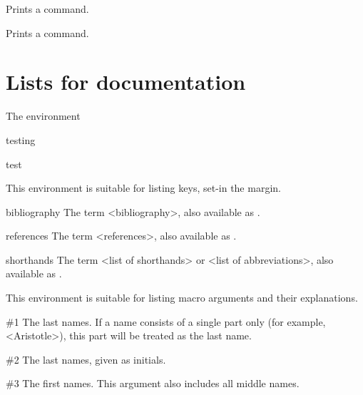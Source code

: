 \begin{marglist}
\item [\cs{cs}]  Prints a command.
\item [\cs{cmd}] \cmd{\cmd}\marg{\cmd{\foo}} Prints a command.
\end{marglist}




\section{Lists for documentation}



The environment 
\begin{marglist}
\item[testing]\lorem
\item [test]\lorem
\end{marglist}

This environment is suitable for listing keys, set-in the margin.

\begin{keymarglist}
\item[bibliography] The term <bibliography>, also available as .
\item[references] The term <references>, also available as .
\item[shorthands] The term <list of shorthands> or <list of abbreviations>, also available as .
\end{keymarglist}


 This environment is suitable for listing macro arguments and their explanations.

\newenvironment*{argumentlist}[1]
  {\list{}{%
     \settowidth{\labelwidth}{\displayverbfont#1}%
     \setlength{\labelsep}{1em}%
     \setlength{\leftmargin}{\labelwidth}%
     \addtolength{\leftmargin}{\labelsep}%
     \setlength{\itemsep}{0pt}%
     \renewcommand*{\makelabel}[1]{\displayverbfont##1\hss}}}
  {\endlist}

\begin{argumentlist}{00}
\item[\#1] The last names. If a name consists of a single part only (for example, <Aristotle>), this part will be treated as the last name.
\item[\#2] The last names, given as initials.
\item[\#3] The first names. This argument also includes all middle names.
\end{argumentlist}

